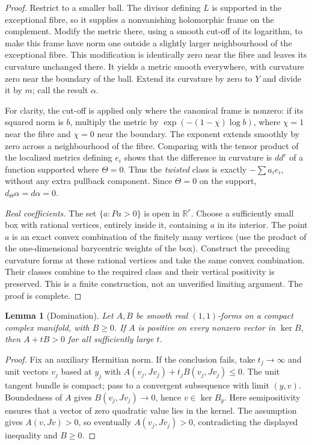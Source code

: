 \documentclass[12pt]{amsart}
\newtheorem{lem}[thm]{Lemma}
\theoremstyle{definition}
\theoremstyle{remark}
\numberwithin{equation}{section}
\newcommand{\R}{\mathbb{R}}
\begin{document}
\begin{proof}
Restrict to a smaller ball. The divisor defining $L$ is supported in the exceptional fibre, so it supplies a nonvanishing holomorphic frame on the complement. Modify the metric there, using a smooth cut-off of its logarithm, to make this frame have norm one outside a slightly larger neighbourhood of the exceptional fibre. This modification is identically zero near the fibre and leaves its curvature unchanged there. It yields a metric smooth everywhere, with curvature zero near the boundary of the ball. Extend its curvature by zero to $Y$ and divide it by $m$; call the result $\alpha$.

For clarity, the cut-off is applied only where the canonical frame is nonzero: if its squared norm is $b$, multiply the metric by $\exp(-(1-\chi)\log b)$, where $\chi=1$ near the fibre and $\chi=0$ near the boundary. The exponent extends smoothly by zero across a neighbourhood of the fibre. Comparing with the tensor product of the localized metrics defining $e_i$ shows that the difference in curvature is $dd^c$ of a function supported where $\Theta=0$. Thus the \emph{twisted} class is exactly $-\sum a_ie_i$, without any extra pullback component. Since $\Theta=0$ on the support, $d_\Theta\alpha=d\alpha=0$.

\emph{Real coefficients.} The set $\{a:Pa>0\}$ is open in $\R^r$. Choose a sufficiently small box with rational vertices, entirely inside it, containing $a$ in its interior. The point $a$ is an exact convex combination of the finitely many vertices (use the product of the one-dimensional barycentric weights of the box). Construct the preceding curvature forms at these rational vertices and take the same convex combination. Their classes combine to the required class and their vertical positivity is preserved. This is a finite construction, not an unverified limiting argument. The proof is complete.
\end{proof}

\begin{lem}[Domination]\label{lem:domination}
Let $A,B$ be smooth real $(1,1)$-forms on a compact complex manifold, with $B\geq0$. If $A$ is positive on every nonzero vector in $\ker B$, then $A+tB>0$ for all sufficiently large $t$.
\end{lem}
\begin{proof}
Fix an auxiliary Hermitian norm. If the conclusion fails, take $t_j\to\infty$ and unit vectors $v_j$ based at $y_j$ with $A(v_j,Jv_j)+t_jB(v_j,Jv_j)\leq0$. The unit tangent bundle is compact; pass to a convergent subsequence with limit $(y,v)$. Boundedness of $A$ gives $B(v_j,Jv_j)\to0$, hence $v\in\ker B_y$. Here semipositivity ensures that a vector of zero quadratic value lies in the kernel. The assumption gives $A(v,Jv)>0$, so eventually $A(v_j,Jv_j)>0$, contradicting the displayed inequality and $B\geq0$.
\end{proof}
\end{document}
